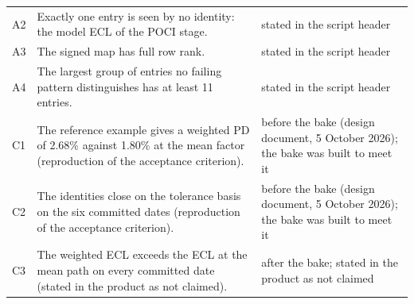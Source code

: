 \begin{longtable}{lp{7.6cm}p{4.4cm}}
A2 & Exactly one entry is seen by no identity: the model ECL of the POCI stage. & stated in the script header \\
A3 & The signed map has full row rank. & stated in the script header \\
A4 & The largest group of entries no failing pattern distinguishes has at least 11 entries. & stated in the script header \\
C1 & The reference example gives a weighted PD of 2.68\% against 1.80\% at the mean factor (reproduction of the acceptance criterion). & before the bake (design document, 5 October 2026); the bake was built to meet it \\
C2 & The identities close on the tolerance basis on the six committed dates (reproduction of the acceptance criterion). & before the bake (design document, 5 October 2026); the bake was built to meet it \\
C3 & The weighted ECL exceeds the ECL at the mean path on every committed date (stated in the product as not claimed). & after the bake; stated in the product as not claimed \\
\end{longtable}
